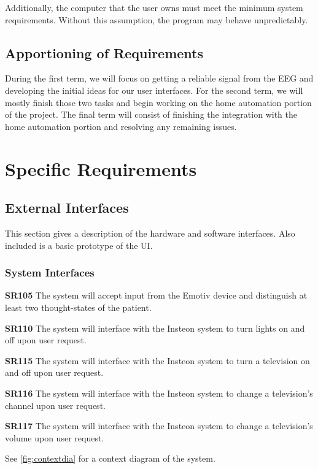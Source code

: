 \documentclass{article}
\begin{document}
Additionally, the computer that the user owns must meet the minimum system
requirements. Without this assumption, the program may behave unpredictably.

\subsection{Apportioning of Requirements}

During the first term, we will focus on getting a reliable signal from the EEG
and developing the initial ideas for our user interfaces. For the second term,
we will mostly finish those two tasks and begin working on the home automation
portion of the project. The final term will consist of finishing the
integration with the home automation portion and resolving any remaining
issues.

\newpage

\section{Specific Requirements}

\subsection{External Interfaces}

This section gives a description of the hardware and software interfaces. Also included is a basic prototype of the UI.

\subsubsection{System Interfaces}
\textbf{SR105} The system will accept input from the Emotiv device and
distinguish at least two thought-states of the patient.

\textbf{SR110} The system will interface with the Insteon system to turn
lights on and off upon user request.

\textbf{SR115} The system will interface with the Insteon system to turn a
television on and off upon user request.

\textbf{SR116} The system will interface with the Insteon system to change a
television's channel upon user request.

\textbf{SR117} The system will interface with the Insteon system to change a
television's volume upon user request.

See \autoref{fig:contextdia} for a context diagram of the system.
\end{document}
